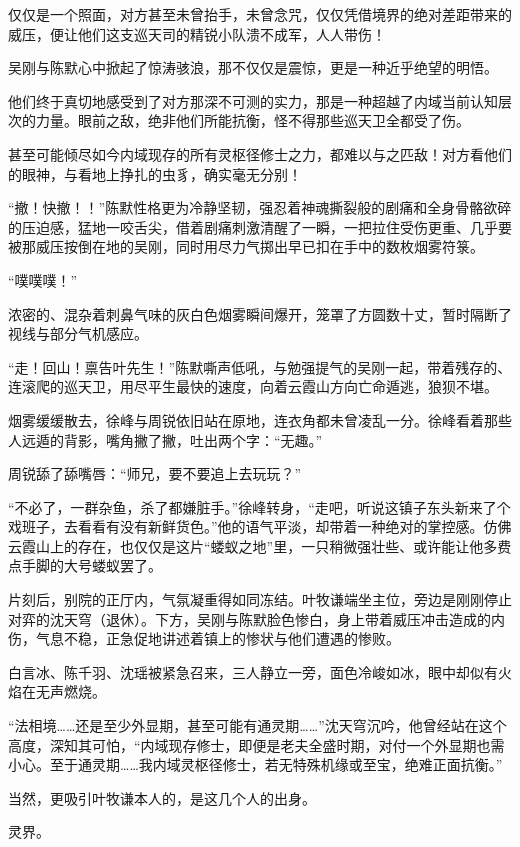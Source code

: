 仅仅是一个照面，对方甚至未曾抬手，未曾念咒，仅仅凭借境界的绝对差距带来的威压，便让他们这支巡天司的精锐小队溃不成军，人人带伤！

吴刚与陈默心中掀起了惊涛骇浪，那不仅仅是震惊，更是一种近乎绝望的明悟。

他们终于真切地感受到了对方那深不可测的实力，那是一种超越了内域当前认知层次的力量。眼前之敌，绝非他们所能抗衡，怪不得那些巡天卫全都受了伤。

甚至可能倾尽如今内域现存的所有灵枢径修士之力，都难以与之匹敌！对方看他们的眼神，与看地上挣扎的虫豸，确实毫无分别！

“撤！快撤！！”陈默性格更为冷静坚韧，强忍着神魂撕裂般的剧痛和全身骨骼欲碎的压迫感，猛地一咬舌尖，借着剧痛刺激清醒了一瞬，一把拉住受伤更重、几乎要被那威压按倒在地的吴刚，同时用尽力气掷出早已扣在手中的数枚烟雾符箓。

“噗噗噗！”

浓密的、混杂着刺鼻气味的灰白色烟雾瞬间爆开，笼罩了方圆数十丈，暂时隔断了视线与部分气机感应。

“走！回山！禀告叶先生！”陈默嘶声低吼，与勉强提气的吴刚一起，带着残存的、连滚爬的巡天卫，用尽平生最快的速度，向着云霞山方向亡命遁逃，狼狈不堪。

烟雾缓缓散去，徐峰与周锐依旧站在原地，连衣角都未曾凌乱一分。徐峰看着那些人远遁的背影，嘴角撇了撇，吐出两个字：“无趣。”

周锐舔了舔嘴唇：“师兄，要不要追上去玩玩？”

“不必了，一群杂鱼，杀了都嫌脏手。”徐峰转身，“走吧，听说这镇子东头新来了个戏班子，去看看有没有新鲜货色。”他的语气平淡，却带着一种绝对的掌控感。仿佛云霞山上的存在，也仅仅是这片“蝼蚁之地”里，一只稍微强壮些、或许能让他多费点手脚的大号蝼蚁罢了。

\vspace{2em}

片刻后，别院的正厅内，气氛凝重得如同冻结。叶牧谦端坐主位，旁边是刚刚停止对弈的沈天穹（退休）。下方，吴刚与陈默脸色惨白，身上带着威压冲击造成的内伤，气息不稳，正急促地讲述着镇上的惨状与他们遭遇的惨败。

白言冰、陈千羽、沈瑶被紧急召来，三人静立一旁，面色冷峻如冰，眼中却似有火焰在无声燃烧。

“法相境……还是至少外显期，甚至可能有通灵期……”沈天穹沉吟，他曾经站在这个高度，深知其可怕，“内域现存修士，即便是老夫全盛时期，对付一个外显期也需小心。至于通灵期……我内域灵枢径修士，若无特殊机缘或至宝，绝难正面抗衡。”

当然，更吸引叶牧谦本人的，是这几个人的出身。

灵界。

